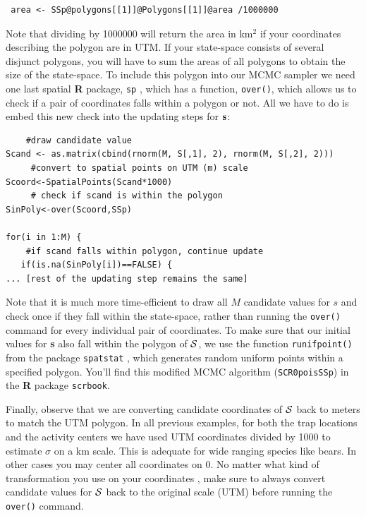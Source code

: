 \begin{verbatim}
 area <- SSp@polygons[[1]]@Polygons[[1]]@area /1000000
\end{verbatim}

 Note that dividing by 1000000 will return the area in km$^2$ if your coordinates describing the polygon are in UTM. If your state-space consists of several disjunct polygons, you will have to sum the areas of all polygons to obtain the size of the state-space.
To include this polygon into our MCMC sampler we need one last spatial 
{\bf R} package, \mbox{\tt sp} \citep{pebesma_bivand:2011}, which has a 
function, \verb#over()#, which allows us to check if a pair of coordinates 
falls within a polygon or not. All we have to do is embed this new check 
into the updating steps for ${\bf s}$:
\begin{verbatim}
    #draw candidate value
Scand <- as.matrix(cbind(rnorm(M, S[,1], 2), rnorm(M, S[,2], 2)))
     #convert to spatial points on UTM (m) scale
Scoord<-SpatialPoints(Scand*1000)   
     # check if scand is within the polygon
SinPoly<-over(Scoord,SSp)		

for(i in 1:M) {
    #if scand falls within polygon, continue update
   if(is.na(SinPoly[i])==FALSE) {		
... [rest of the updating step remains the same]
\end{verbatim}
Note that it is much more time-efficient to draw all $M$ candidate values 
for $s$ and check once if they fall within the state-space, rather than 
running the \verb#over()# command for every individual pair of 
coordinates. To make sure that our initial values for {\bf s} also fall 
within the polygon of ${\cal S}$, we use the function \verb#runifpoint()# 
from the package \mbox{\tt spatstat} \citep{baddeley_turner:2005}, 
which generates random uniform points within a specified polygon. You'll 
find this modified MCMC algorithm (\mbox{\tt SCR0poisSSp}) in the {\bf R} 
package \mbox{\tt scrbook}.

Finally, observe that we are converting candidate coordinates of ${\cal S}$ 
back to meters to match the UTM polygon. In all previous examples, 
for both the trap locations and the activity centers we have used UTM 
coordinates divided by 1000 to estimate $\sigma$ on a km scale. This is 
adequate for wide ranging species like bears. In other cases you 
may center all coordinates on 0. No matter what kind of transformation you 
use on your coordinates , make sure to always convert candidate values for 
${\cal S}$ back to the original scale (UTM) before running the 
\verb#over()# command.

